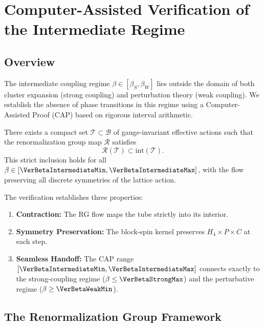 
\section{Computer-Assisted Verification of the Intermediate Regime}
\label{sec:cap_verification}
\label{ch:computer-verify}

\subsection{Overview}

The intermediate coupling regime $\beta \in [\beta_S, \beta_W]$ lies outside the domain of both cluster expansion (strong coupling) and perturbation theory (weak coupling). We establish the absence of phase transitions in this regime using a Computer-Assisted Proof (CAP) based on rigorous interval arithmetic.

\begin{theorem}
\label{thm:tube_contraction_cap}
There exists a compact set $\mathcal{T} \subset \mathcal{B}$ of gauge-invariant effective actions such that the renormalization group map $\mathcal{R}$ satisfies
\[
\mathcal{R}(\mathcal{T}) \subset \mathrm{int}(\mathcal{T}).
\]
This strict inclusion holds for all $\beta \in [\VerBetaIntermediateMin, \VerBetaIntermediateMax]$, with the flow preserving all discrete symmetries of the lattice action.
\end{theorem}

The verification establishes three properties:
\begin{enumerate}
\item \textbf{Contraction:} The RG flow maps the tube strictly into its interior.
\item \textbf{Symmetry Preservation:} The block-spin kernel preserves $H_4 \times P \times C$ at each step.
\item \textbf{Seamless Handoff:} The CAP range $[\VerBetaIntermediateMin, \VerBetaIntermediateMax]$ connects exactly to the strong-coupling regime ($\beta \le \VerBetaStrongMax$) and the perturbative regime ($\beta \ge \VerBetaWeakMin$).
\end{enumerate}

\subsection{The Renormalization Group Framework}

